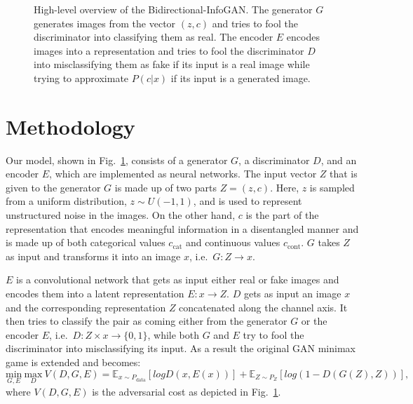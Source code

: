 \documentclass{esannV2}
\begin{document}
\begin{figure}
 \vspace{-0.5cm}
\caption{High-level overview of the Bidirectional-InfoGAN. The generator $G$ generates images from the vector $(z, c)$ and tries to fool the discriminator into classifying them as real. The encoder $E$ encodes images into a representation and tries to fool the discriminator $D$ into misclassifying them as fake if its input is a real image while trying to approximate $P(c\vert x)$ if its input is a generated image.}
\vspace{-0.3cm}
\label{fig:model_architecture}
\end{figure}


\section{Methodology}
Our model, shown in Fig.~\ref{fig:model_architecture}, consists of a generator $G$, a discriminator $D$, and an encoder $E$, which are implemented as neural networks. The input vector $Z$ that is given to the generator $G$ is made up of two parts $Z = (z, c)$. Here, $z$ is sampled from a uniform distribution, $z\sim U(-1, 1)$, and is used to represent unstructured noise in the images. On the other hand, $c$ is the part of the representation that encodes meaningful information in a disentangled manner and is made up of both categorical values $c_{\text{cat}}$ and continuous values $c_{\text{cont}}$. $G$ takes $Z$ as input and transforms it into an image $x$, i.e.\ $G: Z\rightarrow x$.

$E$ is a convolutional network that gets as input either real or fake images and encodes them into a latent representation $E: x\rightarrow Z$. $D$ gets as input an image $x$ and the corresponding representation $Z$ concatenated along the channel axis. It then tries to classify the pair as coming either from the generator $G$ or the encoder $E$, i.e.\ $D: Z\times x\rightarrow \{0,1\}$, while both $G$ and $E$ try to fool the discriminator into misclassifying its input. As a result the original GAN minimax game \cite{Goodfellow2014} is extended and becomes:
\[\underset{G, E}{\text{min}}\ \underset{D}{\text{max}}\ V(D, G, E) = \mathbb{E}_{x\sim P_{\text{data}}}[logD(x, E(x))] + \mathbb{E}_{Z\sim P_Z}[log(1-D(G(Z), Z))],\]
where $V(D, G, E)$ is the adversarial cost as depicted in Fig.~\ref{fig:model_architecture}.
\end{document}
